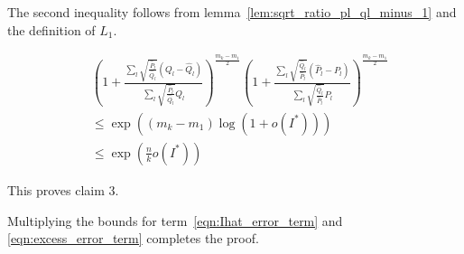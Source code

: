 \documentclass{article}
\begin{document}
The second inequality follows from lemma~\ref{lem:sqrt_ratio_pl_ql_minus_1} and the definition of $L_1$. 

\begin{align*}
& \left( 1 + 
   \frac{\sum_l \sqrt{\frac{\hat{P}_l}{\hat{Q}_l}} (Q_l - \hat{Q}_l)}
        {\sum_l \sqrt{\frac{\hat{P}_l}{\hat{Q}_l}} \hat{Q}_l} 
     \right)^{\frac{m_k - m_1}{2}} 
   \left( 1+ \frac{\sum_l \sqrt{\frac{\hat{Q}_l}{\hat{P}_l}} (\hat{P}_l - P_l)}
         {\sum_l \sqrt{\frac{\hat{Q}_l}{\hat{P}_l}} P_l } \right)^{\frac{m_k - m_1}{2}} 
\\
&\leq \exp\left( (m_k - m_1) \log(1 + o(I^*) ) \right) \\
&\leq \exp \left( \frac{n}{k} o(I^*) \right) 
\end{align*}

This proves claim 3. 

Multiplying the bounds for term~\ref{eqn:Ihat_error_term} and \ref{eqn:excess_error_term} completes the proof. 


\end{document}
